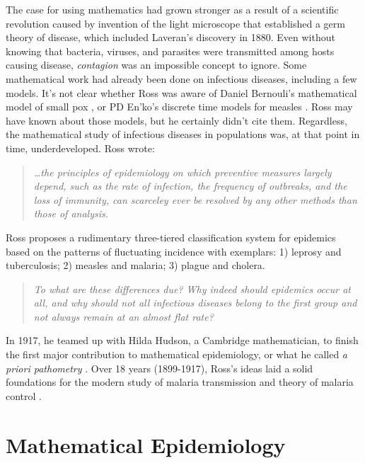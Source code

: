 \documentclass[
]{book}
\begin{document}
The case for using mathematics had grown stronger as a result of a scientific revolution caused by invention of the light microscope that established a germ theory of disease, which included Laveran's discovery in 1880. Even without knowing that bacteria, viruses, and parasites were transmitted among hosts causing disease, \emph{contagion} was an impossible concept to ignore. Some mathematical work had already been done on infectious diseases, including a few models. It's not clear whether Ross was aware of Daniel Bernouli's mathematical model of small pox \autocite{BernoulliD2004AttemptNew,BacaerN2011DanielBernoulli}, or PD En'ko's discrete time models for measles \autocite{DietzK1988FirstEpidemic}.
Ross may have known about those models, but he certainly didn't cite them.
Regardless, the mathematical study of infectious diseases in populations was, at that point in time, underdeveloped.
Ross wrote:

\begin{quote}
\emph{\ldots the principles of epidemiology on which preventive measures largely depend, such as the rate of infection, the frequency of outbreaks, and the loss of immunity, can scarceley ever be resolved by any other methods than those of analysis.}
\end{quote}

Ross proposes a rudimentary three-tiered classification system for epidemics based on the patterns of fluctuating incidence with exemplars: 1) leprosy and tuberculosis; 2) measles and malaria; 3) plague and cholera.

\begin{quote}
\emph{To what are these differences due? Why indeed should epidemics occur at all, and why should not all infectious diseases belong to the first group and not always remain at an almost flat rate?}
\end{quote}

In 1917, he teamed up with Hilda Hudson, a Cambridge mathematician, to finish the first major contribution to mathematical epidemiology, or what he called \emph{a priori pathometry} \autocite{RossR1917AprioriPathometry2,RossR1917AprioriPathometry3}.
Over 18 years (1899-1917), Ross's ideas laid a solid foundations for the modern study of malaria transmission and theory of malaria control \autocite{SmithDL2012_RossMacdonald}.

\section{Mathematical Epidemiology}\label{mathematical-epidemiology}
\end{document}
